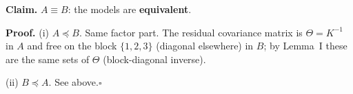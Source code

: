 \documentclass[10pt,a4paper]{article}
\newcommand{\nest}{\preceq}
\begin{document}
\par\bigskip
\noindent\textbf{Claim.} $A \equiv B$: the models are \textbf{equivalent}.\par\smallskip
\noindent\textbf{Proof.} (i) $A\nest B$. Same factor part. The residual covariance matrix is $\Theta=K^{-1}$ in $A$ and free on the block $\{1,2,3\}$ (diagonal elsewhere) in $B$; by Lemma~I these are the same sets of $\Theta$ (block-diagonal inverse).\par\smallskip
\noindent(ii) $B\nest A$. See above.\hfill$\square$\par\medskip
{}

\clearpage
\end{document}
